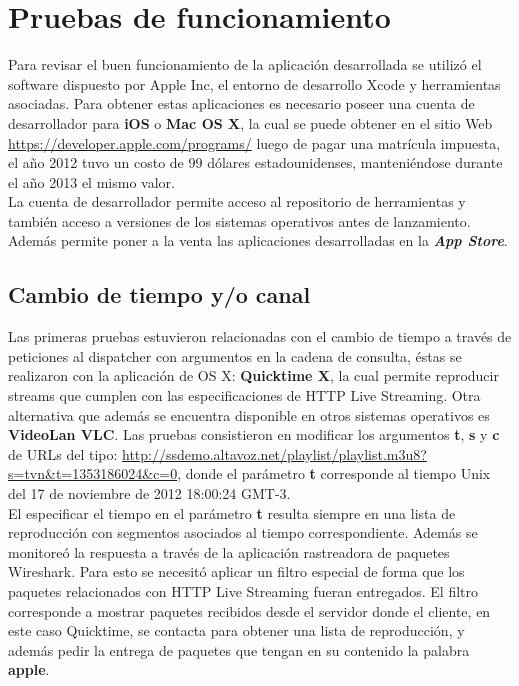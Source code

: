 
\chapter{Pruebas de funcionamiento}

Para revisar el buen funcionamiento de la aplicación desarrollada se utilizó el software dispuesto por Apple Inc, el entorno de desarrollo Xcode y herramientas asociadas. Para obtener estas aplicaciones es necesario poseer una cuenta de desarrollador para \textbf{iOS} o \textbf{Mac OS X}, la cual se puede obtener en el sitio Web \url{https://developer.apple.com/programs/} luego de pagar una matrícula impuesta, el año 2012 tuvo un costo de 99 dólares estadounidenses, manteniéndose durante el año 2013 el mismo valor.\\

La cuenta de desarrollador permite acceso al repositorio de herramientas \cite{apple-repositorio} y también acceso a versiones de los sistemas operativos antes de lanzamiento.
Además permite poner a la venta las aplicaciones desarrolladas en la \textit{\textbf{App Store}}\cite{apple-appstore}.

\section{Cambio de tiempo y/o canal}

Las primeras pruebas estuvieron relacionadas con el cambio de tiempo a través de peticiones al dispatcher con argumentos en la cadena de consulta, éstas se realizaron con la aplicación de OS X: \textbf{Quicktime X}, la cual permite reproducir streams que cumplen con las especificaciones de HTTP Live Streaming. Otra alternativa que además se encuentra disponible en otros sistemas operativos es \textbf{VideoLan VLC}. Las pruebas consistieron en modificar los argumentos \textbf{t}, \textbf{s} y \textbf{c} de URLs del tipo:
\url{http://ssdemo.altavoz.net/playlist/playlist.m3u8?s=tvn&t=1353186024&c=0}, donde el parámetro \textbf{t} corresponde al tiempo Unix del 17 de noviembre de 2012 18:00:24 GMT-3.\\

El especificar el tiempo en el parámetro \textbf{t} resulta siempre en una lista de reproducción con segmentos asociados al tiempo correspondiente. Además se monitoreó la respuesta a través de la aplicación rastreadora de paquetes Wireshark. Para esto se necesitó aplicar un filtro especial de forma que los paquetes relacionados con HTTP Live Streaming fueran entregados. El filtro corresponde a mostrar paquetes recibidos desde el servidor donde el cliente, en este caso Quicktime, se contacta para obtener una lista de reproducción, y además pedir la entrega de paquetes que tengan en su contenido la palabra \textbf{apple}.


